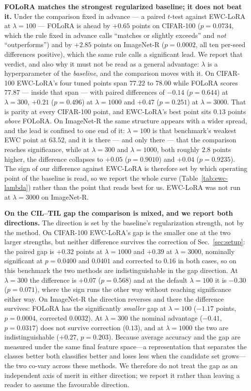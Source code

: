 \textbf{FOLoRA matches the strongest regularized baseline; it does not beat it.} Under the
comparison fixed in advance --- a paired $t$-test against EWC-LoRA at $\lambda=100$ ---
FOLoRA is ahead by $+0.65$ points on CIFAR-100 ($p=0.0734$, which the rule fixed in advance
calls ``matches or slightly exceeds'' and \emph{not} ``outperforms'') and by $+2.85$ points
on ImageNet-R ($p=0.0002$, all ten per-seed differences positive), which the same rule
calls a significant lead. We report that verdict, and also why it must not be read as a
general advantage: $\lambda$ is a hyperparameter of the \emph{baseline}, and the comparison
moves with it. On CIFAR-100 EWC-LoRA's four tuned points span $77.22$ to $78.00$ while
FOLoRA scores $77.87$ --- inside that span --- with paired differences of $-0.14$
($p=0.644$) at $\lambda=300$, $+0.21$ ($p=0.496$) at $\lambda=1000$ and $+0.47$
($p=0.251$) at $\lambda=3000$. That is parity at every CIFAR-100 point, and EWC-LoRA's best
point sits $0.13$ points \emph{above} FOLoRA. On ImageNet-R the same structure appears with
a wider spread, and the lead is confined to one end of it: $\lambda=100$ is that benchmark's
weakest EWC point at $63.52$, and it is there --- and only there --- that the comparison
reaches significance, while at $\lambda=300$ and $\lambda=1000$, both roughly $2.8$ points
higher, the difference collapses to $+0.05$ ($p=0.9010$) and $+0.04$ ($p=0.9235$). The sign of our
difference against EWC-LoRA is therefore set by which operating point of the baseline is
read, so we report the whole curve (Table~\ref{tab:ewc-lambda}) rather than the point that
reads best for us. EWC-LoRA was not run at $\lambda=3000$ on ImageNet-R.

\textbf{On the CIL--TIL gap the comparison is mixed, and we report both directions.} The
direction is set by the baseline's regularization strength, not by the method. On CIFAR-100
EWC-LoRA's gap is the smaller one at the two larger strengths, but neither difference
survives the correction of Sec.~\ref{sec:setup}: the paired gap is $+0.32$ points at
$\lambda=1000$ and $+0.39$ at $\lambda=3000$, nominally significant at $p=0.0400$ and
$0.0401$ and corrected to $0.16$ in both cases, so on this benchmark the two methods are
indistinguishable in the gap direction. At $\lambda=300$ the difference is $+0.07$
($p=0.568$) and at the default $\lambda=100$ it is $-0.30$ ($p=0.071$), where the
sign runs the other way without reaching significance either way. On ImageNet-R the
direction reverses and there the difference survives: FOLoRA has the significantly
\emph{smaller} gap at $\lambda=100$ ($-1.17$ points, $p=0.0004$, corrected $0.0032$). At
$\lambda=300$ the nominal advantage ($-0.41$, $p=0.0317$) does not survive correction
($0.13$), and at $\lambda=1000$ the two are indistinguishable ($+0.27$, $p=0.203$).
Because average accuracy and the gap are measured under the same
final feature space---a representation that separates the classes better both classifies
better and loses less when the candidate set grows---the two co-vary across these methods.
We therefore do not treat the gap as an independent axis of merit in either direction; we
report it rather than leaving a reader to assume the favourable direction.

